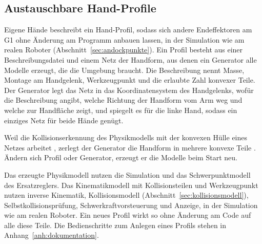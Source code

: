 \subsection{Austauschbare Hand-Profile}
\label{sec:hand_profile}
Eigene Hände beschreibt ein Hand-Profil, sodass sich andere Endeffektoren am G1 ohne Änderung am Programm anbauen lassen, in der Simulation wie am realen Roboter (Abschnitt~\ref{sec:andockpunkte}).
Ein Profil besteht aus einer Beschreibungsdatei und einem Netz der Handform, aus denen ein Generator alle Modelle erzeugt, die die Umgebung braucht.
Die Beschreibung nennt Masse, Montage am Handgelenk, Werkzeugpunkt und die erlaubte Zahl konvexer Teile.
Der Generator legt das Netz in das Koordinatensystem des Handgelenks, wofür die Beschreibung angibt, welche Richtung der Handform vom Arm weg und welche zur Handfläche zeigt, und spiegelt es für die linke Hand, sodass ein einziges Netz für beide Hände genügt.

Weil die Kollisionserkennung des Physikmodells mit der konvexen Hülle eines Netzes arbeitet \cite{MujocoDoku2026a}, zerlegt der Generator die Handform in mehrere konvexe Teile .
Ändern sich Profil oder Generator, erzeugt er die Modelle beim Start neu.

Das erzeugte Physikmodell nutzen die Simulation und das Schwerpunktmodell des Ersatzreglers.
Das Kinematikmodell mit Kollisionsteilen und Werkzeugpunkt nutzen inverse Kinematik, Kollisionsmodell (Abschnitt~\ref{sec:kollisionsmodell}), Selbstkollisionsprüfung, Schwerkraftvorsteuerung und Anzeige, in der Simulation wie am realen Roboter.
Ein neues Profil wirkt so ohne Änderung am Code auf alle diese Teile.
Die Bedienschritte zum Anlegen eines Profils stehen in Anhang~\ref{anh:dokumentation}.

